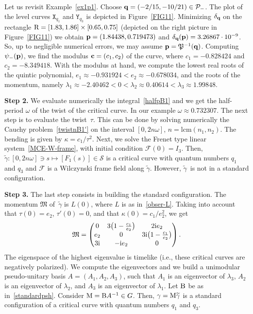 \documentclass[10pt,a4paper]{amsart}
\numberwithin{equation}{section}
\def\S{\mathcal{S}}
\def\S{\mathcal{S}}
\begin{document}
\begin{Example}\label{eex1}
Let us revisit Example~\ref{ex1p1}.
Choose ${\bf q}=(-2/15,-10/21)\in {\mathcal P}_-$. The plot of the level curves ${\mathtt X}_{q_1}$ and ${\mathtt Y}_{q_3}$
is depicted in Figure~\ref{FIG11}. Minimizing $\delta_{{\bf q}}$ on the rectangle ${\rm R}=[1.83,1.86]\times [0.65,0.75]$
(depicted on the right picture in Figure~\ref{FIG11}) we obtain ${\bf p} = (1.84438,0.719473)$
and $\delta_{{\bf q}}({\bf p})=3.26867\cdot 10^{-9}$.
So, up to negligible numerical errors, we may assume
${\bf p}={\mathfrak P}^{-1}({\bf q})$. Computing $\psi_-({\bf p})$, we find the modulus ${\bf c}=(c_1,c_2)$
of the curve, where $c_1=-0.828424$ and $c_2= -8.349418$. With the modulus at hand, we compute
 the lowest real roots of the quintic polynomial, $e_1\approx -0.931924<e_2\approx -0.678034$, and the
 roots of the momentum, namely
 $\lambda_1\approx -2.40462<0<\lambda_2\approx 0.40614<\lambda_3\approx 1.99848$.
 \end{Example}

{\bf Step 2.}
We evaluate numerically the integral~\eqref{halfpB1} and we get the half-period $\omega$ of the twist of the critical curve.
In our example $\omega \approx 0.732307$. The next step is to evaluate the twist~$\tau$.
This can be done by solving numerically the Cauchy problem~\eqref{twistnB1'} on the interval $[0,2n\omega]$,
$n=\mathrm{lcm}(n_1,n_2)$.
The bending is given by $\kappa=c_1/\tau^2$. Next, we solve the Frenet type linear system~\eqref{MCE-W-frame},
with initial condition ${\mathcal F}(0)=I_3$. Then, $\widetilde{\gamma}\colon [0,2n\omega]\ni s\longmapsto [F_1(s)]\in \S$ is a critical
curve with quantum numbers $q_1$ and $q_3$ and ${\mathcal F}$ is a
Wilczynski frame
field along
{$\widetilde{\gamma}$}. However, {$\widetilde{\gamma}$}~is not in a standard configuration.

{\bf Step 3.}
The last step consists in building the standard configuration. The momentum ${\mathfrak M}$
of~$\widetilde{\gamma}$ is $L(0)$, where $L$ is as in~\eqref{obser-L}. Taking into account that $\tau(0)=e_2$,
$\tau'(0)=0$, and that $\kappa(0)=c_1/e_2^2$,
we get
\[
{\mathfrak M}=\begin{pmatrix}
 0 & 3\big(1 - \frac{c_1}{e_2}\big) & 2 {\rm i} e_2\\
 e_2 & 0 & 3{\rm i}\big(1 - \frac{c_1}{e_2}\big)\\
 3{\rm i} & -{\rm i} e_2& 0\\
 \end{pmatrix}.
\]
The eigenspace of the highest eigenvalue is timelike (i.e., these critical curves are
{negatively}
polarized).
We compute the eigenvectors and we build a unimodular pseudo-unitary basis ${A}=({A}_1,{A}_2, {A}_3)$,
 such that ${A}_1$ is an eigenvector of $\lambda_3$, ${A}_2$ is an eigenvector of $\lambda_2$, and ${A}_3$
 is an eigenvector of $\lambda_1$.
Let ${\rm B}$ be as in~\eqref{standardpsh}. Consider ${\rm M}={\rm B}{A}^{-1}\in {G}$.
Then, {$\gamma={\rm M}\widetilde{\gamma}$} is a standard configuration of a critical curve
with quantum numbers $q_1$ and $q_3$.
\end{document}
